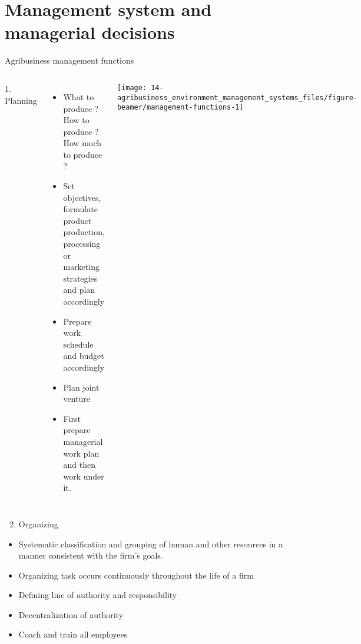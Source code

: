 \documentclass[12pt,ignorenonframetext,aspectratio=169]{beamer}
\providecommand{\tightlist}{%
  \setlength{\itemsep}{0pt}\setlength{\parskip}{0pt}}
\begin{document}
\hypertarget{management-system-and-managerial-decisions}{%
\section{Management system and managerial
decisions}\label{management-system-and-managerial-decisions}}

\begin{frame}{Agribusiness management functions}
\protect\hypertarget{agribusiness-management-functions}{}
\begin{columns}


\footnotesize
1. Planning

\begin{itemize}
\item What to produce ? How to produce ? How much to produce ?
\item Set objectives, formulate product production, processing or marketing strategies and plan accordingly
\item Prepare work schedule and budget accordingly
\item Plan joint venture
\item First prepare managerial work plan and then work under it.
\end{itemize}



\texttt{[image: 14-agribusiness\_environment\_management\_systems\_files/figure-beamer/management-functions-1]} 


\end{columns}
\end{frame}

\begin{frame}{}
\protect\hypertarget{section-1}{}
\begin{enumerate}
\setcounter{enumi}{1}
\tightlist
\item
  Organizing
\end{enumerate}

\begin{itemize}
\tightlist
\item
  Systematic classification and grouping of human and other resources in
  a manner consistent with the firm's goals.
\item
  Organizing task occurs continuously throughout the life of a firm
\item
  Defining line of authority and responsibility
\item
  Decentralization of authority
\item
  Coach and train all employees
\end{itemize}
\end{frame}
\end{document}
